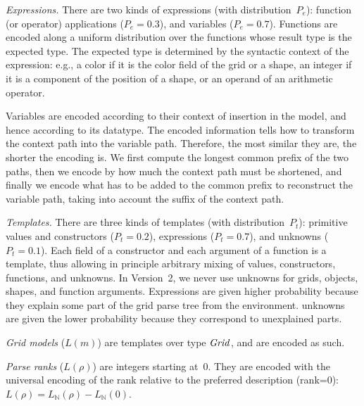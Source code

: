 \documentclass[a4paper]{llncs}
\newcommand{\KILL}[1]{}
\newcommand{\nat}{\mathbb{N}}
\begin{document}
{\em Expressions.} There are two kinds of expressions (with
distribution~$P_e$): function (or operator) applications
($P_e = 0.3$), and variables ($P_e = 0.7$). Functions are encoded
along a uniform distribution over the functions whose result type is
the expected type. The expected type is determined by the syntactic
context of the expression: e.g., a color if it is the color field of
the grid or a shape, an integer if it is a component of the position
of a shape, or an operand of an arithmetic operator.
%
\KILL{Version 2.2: Variables are encoded according to the environment signature, i.e. the
set of variables that are available in the environment, grouped by
data type. A variable is encoded according to a probability
distribution over the environment variables of same type. In order to
distinguish between the same-type variables, we define the probability
distribution as the softmax of the similarities between the paths of
those variables with the expression path. This implies that defining a
shape height as a function of a shape height is prefered to defining
it as a function of a shape width or a shape position.}
%
Variables are encoded according to their context of insertion in the
model, and hence according to its datatype. The encoded information
tells how to transform the context path into the variable
path. Therefore, the most similar they are, the shorter the encoding
is. We first compute the longest common prefix of the two paths, then
we encode by how much the context path must be shortened, and finally
we encode what has to be added to the common prefix to reconstruct the
variable path, taking into account the suffix of the context path.

{\em Templates.} There are three kinds of templates (with
distribution~$P_t$): primitive values and constructors ($P_t = 0.2$),
expressions ($P_t = 0.7$), and unknowns ($P_t = 0.1$). Each field of a
constructor and each argument of a function is a template, thus
allowing in principle arbitrary mixing of values, constructors,
functions, and unknowns. In Version~2, we never use unknowns for
grids, objects, shapes, and function arguments. Expressions are given
higher probability because they explain some part of the grid parse
tree from the environment. unknowns are given the lower probability
because they correspond to unexplained parts.

{\em Grid models} ($L(m)$) are templates over type ${\it Grid}$,
and are encoded as such.

{\em Parse ranks} ($L(\rho)$) are integers starting at~0. They are
encoded with the universal encoding of the rank relative to the
preferred description (rank=0): $L(\rho) = L_\nat(\rho) - L_\nat(0)$.
\end{document}

